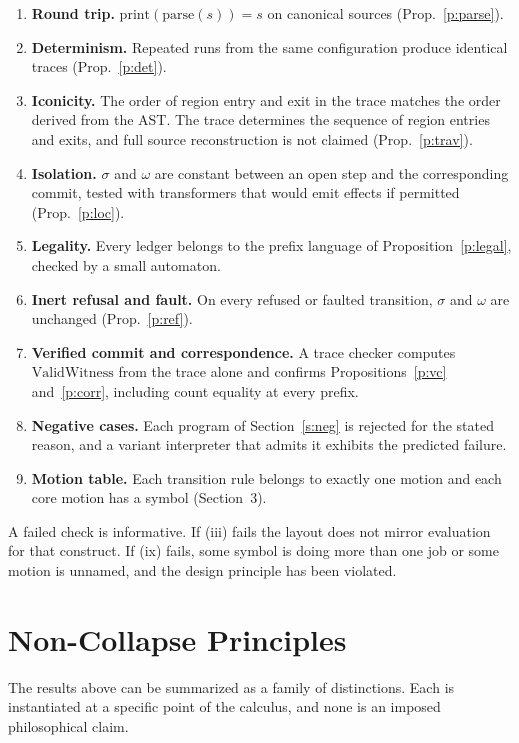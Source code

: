\documentclass[11pt]{article}
\begin{document}
\begin{enumerate}[label=(\roman*)]
\item \textbf{Round trip.} $\mathrm{print}(\mathrm{parse}(s))=s$ on canonical sources (Prop.~\ref{p:parse}).
\item \textbf{Determinism.} Repeated runs from the same configuration produce identical traces (Prop.~\ref{p:det}).
\item \textbf{Iconicity.} The order of region entry and exit in the trace matches the order derived from the AST. The trace determines the sequence of region entries and exits, and full source reconstruction is not claimed (Prop.~\ref{p:trav}).
\item \textbf{Isolation.} $\sigma$ and $\omega$ are constant between an open step and the corresponding commit, tested with transformers that would emit effects if permitted (Prop.~\ref{p:loc}).
\item \textbf{Legality.} Every ledger belongs to the prefix language of Proposition~\ref{p:legal}, checked by a small automaton.
\item \textbf{Inert refusal and fault.} On every refused or faulted transition, $\sigma$ and $\omega$ are unchanged (Prop.~\ref{p:ref}).
\item \textbf{Verified commit and correspondence.} A trace checker computes $\mathrm{ValidWitness}$ from the trace alone and confirms Propositions~\ref{p:vc} and~\ref{p:corr}, including count equality at every prefix.
\item \textbf{Negative cases.} Each program of Section~\ref{s:neg} is rejected for the stated reason, and a variant interpreter that admits it exhibits the predicted failure.
\item \textbf{Motion table.} Each transition rule belongs to exactly one motion and each core motion has a symbol (Section~3).
\end{enumerate}
A failed check is informative. If (iii) fails the layout does not mirror evaluation for that construct. If (ix) fails, some symbol is doing more than one job or some motion is unnamed, and the design principle has been violated.

\section{Non-Collapse Principles}\label{s:noncollapse}

The results above can be summarized as a family of distinctions. Each is instantiated at a specific point of the calculus, and none is an imposed philosophical claim.
\end{document}
